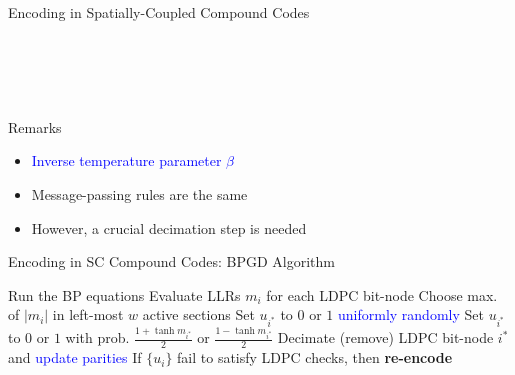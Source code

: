 \documentclass[10pt,presentation]{beamer}
\def\side_information_path{../compound-codes/isit14/slides/Figures}
\begin{document}
\begin{frame}{Encoding in Spatially-Coupled Compound Codes}
  \begin{columns}
    \setlength\tikzheight{5cm}
    \setlength\tikzwidth{6cm}
    \scalebox{0.5}{}

    \scalebox{0.5}{}\\ \vspace{0.3cm}
    \scalebox{0.5}{}\\ \vspace{0.3cm}
    \scalebox{0.5}{}
  \end{columns}
  \begin{block}{Remarks}
    \begin{itemize}
    \item \textcolor{blue}{Inverse temperature parameter $\beta$}
    \item Message-passing rules are the same
    \item However, a \alert{crucial decimation step is needed}
    \end{itemize}
  \end{block}
\end{frame}

\begin{frame}{Encoding in SC Compound Codes: BPGD Algorithm}
  \begin{algorithmic}
 \WHILE{\textcolor{blue}{There are active LDPC bit-nodes}}
    \STATE Run the BP equations
    \ENDFOR
    \STATE Evaluate LLRs $m_{i}$ for each LDPC bit-node
    \STATE Choose max. of $|m_i|$ in \alert{left-most $w$ active sections}
    \STATE Set $u_{i^*}$ to $0$ or $1$ \textcolor{blue}{uniformly randomly}
    \ELSE
    \STATE Set $u_{i^*}$ to $0$ or $1$ with \alert{prob. $\frac{1+\tanh m_{i^*}}{2}$ or $\frac{1-\tanh m_{i^*}}{2}$}
    \ENDIF
    \STATE \alert{Decimate} (remove) LDPC bit-node $i^*$ and \textcolor{blue}{update parities}
 \ENDWHILE
    \STATE If $\{u_{i}\}$ fail to satisfy LDPC checks, then \textbf{\alert{re-encode}}
  \end{algorithmic}
\end{frame}
\end{document}
